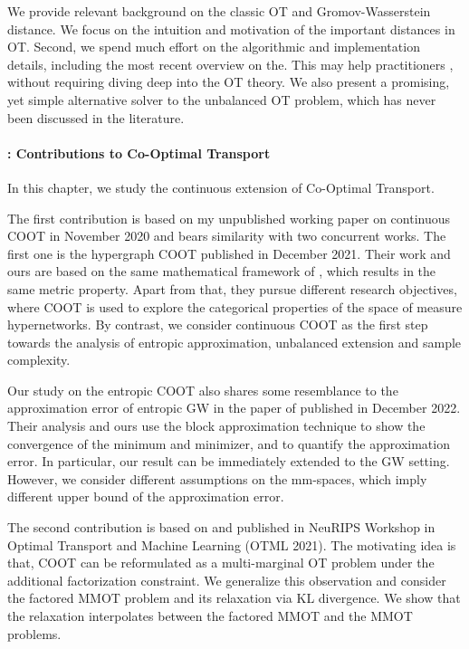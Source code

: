 We provide relevant background on the classic OT and Gromov-Wasserstein distance.
We focus on the intuition and motivation of the important distances in OT.
Second, we spend much effort on the algorithmic and implementation details, including the
most recent overview on the. This may help practitioners , without requiring
diving deep into the OT theory.
We also present a promising, yet simple alternative solver to the unbalanced OT problem,
which has never been discussed in the literature.

\paragraph{: Contributions to Co-Optimal Transport}

In this chapter, we study the continuous extension of Co-Optimal Transport.

The first contribution is based on my unpublished working paper
on continuous COOT in November 2020 and bears similarity with two concurrent works.
The first one is the hypergraph COOT \citep{Chowdhury21b} published in December 2021.
Their work and ours are based on the same mathematical framework of \citep{Chowdhury19},
which results in the same metric property. Apart from that, they pursue different research objectives,
where COOT is used to explore the categorical properties of the space of measure hypernetworks.
By contrast, we consider continuous COOT as the first step towards the analysis of
entropic approximation, unbalanced extension and sample complexity.

Our study on the entropic COOT also shares some resemblance to the approximation error of
entropic GW in the paper of \citep{Zhang23} published in December 2022.
Their analysis and ours use the block approximation technique \citep{Carlier17}
to show the convergence of the minimum and minimizer, and to quantify the approximation error.
In particular, our result can be immediately extended to the GW setting. However,
we consider different assumptions on the mm-spaces,
which imply different upper bound of the approximation error.

The second contribution is based on \citep{Tran21} and published in NeuRIPS Workshop in Optimal
Transport and Machine Learning (OTML 2021). The motivating idea is that,
COOT can be reformulated as a multi-marginal OT problem under the additional factorization constraint.
We generalize this observation and consider the factored MMOT problem and its relaxation
via KL divergence. We show that the relaxation interpolates between the factored MMOT and the
MMOT problems.

